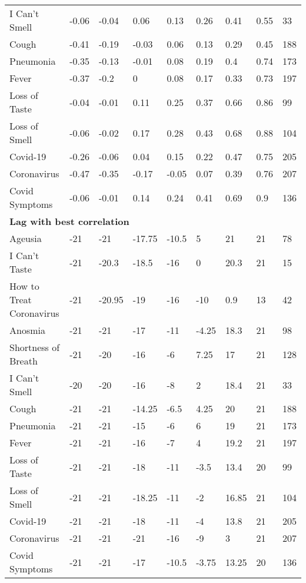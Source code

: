 \begin{tabular}{l llllllll}
I Can't Smell & -0.06 & -0.04 & 0.06 & 0.13 & 0.26 & 0.41 & 0.55 & 33  \\ 
Cough & -0.41 & -0.19 & -0.03 & 0.06 & 0.13 & 0.29 & 0.45 & 188  \\ 
Pneumonia & -0.35 & -0.13 & -0.01 & 0.08 & 0.19 & 0.4 & 0.74 & 173  \\ 
Fever & -0.37 & -0.2 & 0 & 0.08 & 0.17 & 0.33 & 0.73 & 197  \\ 
Loss of Taste & -0.04 & -0.01 & 0.11 & 0.25 & 0.37 & 0.66 & 0.86 & 99  \\ 
Loss of Smell & -0.06 & -0.02 & 0.17 & 0.28 & 0.43 & 0.68 & 0.88 & 104  \\ 
Covid-19 & -0.26 & -0.06 & 0.04 & 0.15 & 0.22 & 0.47 & 0.75 & 205  \\ 
Coronavirus & -0.47 & -0.35 & -0.17 & -0.05 & 0.07 & 0.39 & 0.76 & 207  \\ 
Covid Symptoms & -0.06 & -0.01 & 0.14 & 0.24 & 0.41 & 0.69 & 0.9 & 136  \\ 
\hline 
\multicolumn{9}{l}{{\bf Lag with best correlation}} \\ 
Ageusia & -21 & -21 & -17.75 & -10.5 & 5 & 21 & 21 & 78  \\ 
I Can't Taste & -21 & -20.3 & -18.5 & -16 & 0 & 20.3 & 21 & 15  \\ 
How to Treat Coronavirus & -21 & -20.95 & -19 & -16 & -10 & 0.9 & 13 & 42  \\ 
Anosmia & -21 & -21 & -17 & -11 & -4.25 & 18.3 & 21 & 98  \\ 
Shortness of Breath & -21 & -20 & -16 & -6 & 7.25 & 17 & 21 & 128  \\ 
I Can't Smell & -20 & -20 & -16 & -8 & 2 & 18.4 & 21 & 33  \\ 
Cough & -21 & -21 & -14.25 & -6.5 & 4.25 & 20 & 21 & 188  \\ 
Pneumonia & -21 & -21 & -15 & -6 & 6 & 19 & 21 & 173  \\ 
Fever & -21 & -21 & -16 & -7 & 4 & 19.2 & 21 & 197  \\ 
Loss of Taste & -21 & -21 & -18 & -11 & -3.5 & 13.4 & 20 & 99  \\ 
Loss of Smell & -21 & -21 & -18.25 & -11 & -2 & 16.85 & 21 & 104  \\ 
Covid-19 & -21 & -21 & -18 & -11 & -4 & 13.8 & 21 & 205  \\ 
Coronavirus & -21 & -21 & -21 & -16 & -9 & 3 & 21 & 207  \\ 
Covid Symptoms & -21 & -21 & -17 & -10.5 & -3.75 & 13.25 & 20 & 136  \\ 
\hline 
\end{tabular} 